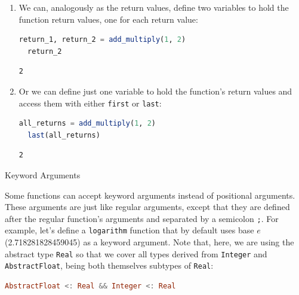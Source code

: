 \documentclass[
  notoc %
]{tufte-book}
\makeatletter
\newcommand{\passthrough}[1]{#1}
\renewcommand\subsubsection{%
\@startsection{subsubsection}{3}{\z@ }{-3.25ex\@plus -1ex \@minus -.2ex}{1.5ex \@plus .2ex}{\normalfont \normalsize \bfseries }
}
\makeatother
\begin{document}
\begin{enumerate}
\def\labelenumi{\arabic{enumi}.}
\item
  We can, analogously as the return values, define two variables to hold
  the function return values, one for each return value:

  \begin{lstlisting}[language=Julia]
  return_1, return_2 = add_multiply(1, 2)
  return_2
  \end{lstlisting}

  \begin{lstlisting}[language=Output]
  2
  \end{lstlisting}
\item
  Or we can define just one variable to hold the function's return
  values and access them with either \passthrough{\lstinline!first!} or
  \passthrough{\lstinline!last!}:

  \begin{lstlisting}[language=Julia]
  all_returns = add_multiply(1, 2)
  last(all_returns)
  \end{lstlisting}

  \begin{lstlisting}[language=Output]
  2
  \end{lstlisting}
\end{enumerate}

\hypertarget{sec:function_keyword_arguments}{%
\subsubsection{Keyword Arguments}\label{sec:function_keyword_arguments}}

Some functions can accept keyword arguments instead of positional
arguments. These arguments are just like regular arguments, except that
they are defined after the regular function's arguments and separated by
a semicolon \passthrough{\lstinline!;!}. For example, let's define a
\passthrough{\lstinline!logarithm!} function that by default uses base
\(e\) (2.718281828459045) as a keyword argument. Note that, here, we are
using the abstract type \passthrough{\lstinline!Real!} so that we cover
all types derived from \passthrough{\lstinline!Integer!} and
\passthrough{\lstinline!AbstractFloat!}, being both themselves subtypes
of \passthrough{\lstinline!Real!}:

\begin{lstlisting}[language=Julia]
AbstractFloat <: Real && Integer <: Real
\end{lstlisting}
\end{document}
